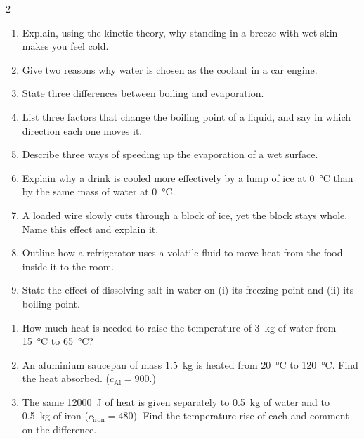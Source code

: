 \documentclass[10pt]{article}
\begin{document}
\begin{multicols}{2}
\begin{tcolorbox}[breakable,enhanced,colback=nbbg,colframe=nbred,
  coltitle=white,fonttitle=\bfseries,
  title=Part A --- Conceptual / short answer,
  boxrule=0.6pt,arc=2pt]
\begin{enumerate}[leftmargin=*,nosep,label=\textbf{Q\arabic*.}]
  \item Explain, using the kinetic theory, why standing in a breeze
        with wet skin makes you feel cold.
  \item Give two reasons why water is chosen as the coolant in a car
        engine.
  \item State three differences between boiling and evaporation.
  \item List three factors that change the boiling point of a liquid,
        and say in which direction each one moves it.
  \item Describe three ways of speeding up the evaporation of a wet
        surface.
  \item Explain why a drink is cooled more effectively by a lump of ice
        at \SI{0}{\degreeCelsius} than by the same mass of water at
        \SI{0}{\degreeCelsius}.
  \item A loaded wire slowly cuts through a block of ice, yet the block
        stays whole. Name this effect and explain it.
  \item Outline how a refrigerator uses a volatile fluid to move heat
        from the food inside it to the room.
  \item State the effect of dissolving salt in water on (i) its
        freezing point and (ii) its boiling point.
\end{enumerate}
\end{tcolorbox}

\begin{tcolorbox}[breakable,enhanced,colback=exbg,colframe=exgreen,
  coltitle=white,fonttitle=\bfseries,
  title=Part B --- Calculations using Q = mc$\Delta\theta$,
  boxrule=0.6pt,arc=2pt]
\begin{enumerate}[leftmargin=*,nosep,label=\textbf{Q\arabic*.},start=10]
  \item How much heat is needed to raise the temperature of
        \SI{3}{\kilogram} of water from \SI{15}{\degreeCelsius} to
        \SI{65}{\degreeCelsius}?
  \item An aluminium saucepan of mass \SI{1.5}{\kilogram} is heated
        from \SI{20}{\degreeCelsius} to \SI{120}{\degreeCelsius}.
        Find the heat absorbed. ($c_{\text{Al}}=900$.)
  \item The same \SI{12000}{\joule} of heat is given separately to
        \SI{0.5}{\kilogram} of water and to \SI{0.5}{\kilogram} of iron
        ($c_{\text{iron}}=480$). Find the temperature rise of each and
        comment on the difference.
\end{enumerate}
\end{tcolorbox}


\end{multicols}
\end{document}

